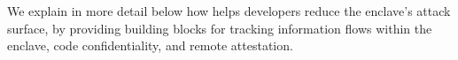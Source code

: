 We explain in more detail below how \sysname{} helps developers reduce the enclave's attack surface,
by providing building blocks for tracking information flows within the enclave, code confidentiality, and remote attestation.












